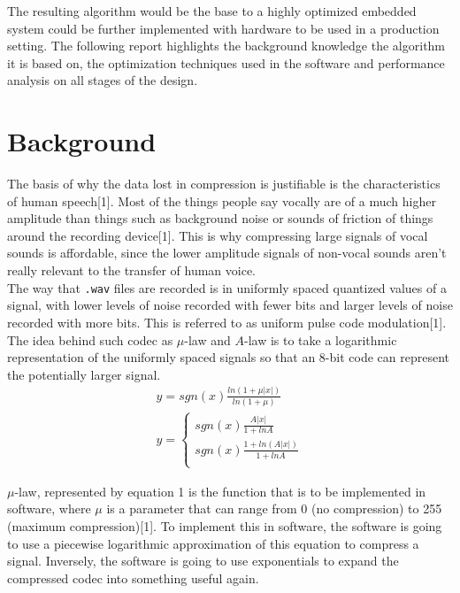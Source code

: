 \documentclass[12pt]{article}
\begin{document}
The resulting algorithm would be the base to a highly optimized embedded system could be further implemented with hardware to be used in a production setting. The following report highlights the background knowledge the algorithm it is based on, the optimization techniques used in the software and performance analysis on all stages of the design.\\
 
\section{Background}

The basis of why the data lost in compression is justifiable is the characteristics of human speech[1]. Most of the things people say vocally are of a much higher amplitude than things such as background noise or sounds of friction of things around the recording device[1]. This is why compressing large signals of vocal sounds is affordable, since the lower amplitude signals of non-vocal sounds aren't really relevant to the transfer of human voice. \\

The way that \texttt{.wav} files are recorded is in uniformly spaced quantized values of a signal, with lower levels of noise recorded with fewer bits and larger levels of noise recorded with more bits. This is referred to as uniform pulse code modulation[1]. The idea behind such codec as $\mu$-law and $A$-law is to take a logarithmic representation of the uniformly spaced signals so that an 8-bit code can represent the potentially larger signal. \\

\begin{align}
y = sgn(x)\frac{ln(1+\mu|x|)}{ln(1+ \mu)}\\
y = \begin{cases}
sgn(x)\frac{A|x|}{1+ln A} \\
sgn(x)\frac{1+ln(A|x|)}{1 + ln A}\\
\end{cases}
\end{align}

$\mu$-law, represented by equation 1 is the function that is to be implemented in software, where $\mu$ is a parameter that can range from 0 (no compression) to 255 (maximum compression)[1]. To implement this in software, the software is going to use a piecewise logarithmic approximation of this equation to compress a signal. Inversely, the software is going to use exponentials to expand the compressed codec into something useful again. \\
\end{document}

